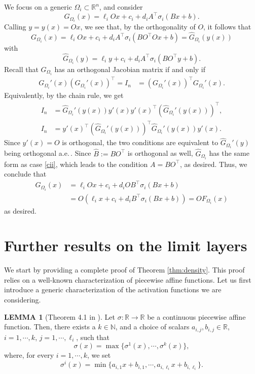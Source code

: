 \documentclass{article}
\theoremstyle{plain}
\theoremstyle{definition}
\theoremstyle{definition}
\newtheorem{lemma}[theorem]{LEMMA}
\theoremstyle{remark}
\theoremstyle{definition}
\theoremstyle{definition}
\theoremstyle{remark}
\numberwithin{equation}{section}
\begin{document}
We focus on a generic $\Omega_i\subset\mathbb{R}^n$, and consider
\[
G_{\Omega_i}(x) = \ell_i O x + c_i + d_i A^\top \sigma_i(Bx+b).
\]
Calling $y=y(x)=Ox$, we see that, by the orthogonality of $O$, it follows that
\[
G_{\Omega_i}(x)=\ell_i O x + c_i + d_i A^\top \sigma_i(BO^\top Ox+b) = \widehat{G}_{\Omega_i}(y(x)) 
\]
with 
\[
\widehat{G}_{\Omega_i}(y) = \ell_i y + c_i + d_i A^\top \sigma_i(BO^\top y + b).
\]
Recall that $G_{\Omega_i}$ has an orthogonal Jacobian matrix if and only if
\[
\begin{split}
G_{\Omega_i}'(x)(G_{\Omega_i}'(x))^\top = I_n &=(G_{\Omega_i}'(x))^\top G_{\Omega_i}'(x).
\end{split}
\]
Equivalently, by the chain rule, we get
\[
\begin{split}
I_n &=\widehat{G}_{\Omega_i}'(y(x))y'(x)y'(x)^\top (\widehat{G}_{\Omega_i}'(y(x)))^\top, \\
I_n &=y'(x)^\top (\widehat{G}_{\Omega_i}'(y(x)))^\top \widehat{G}_{\Omega_i}'(y(x))y'(x).
\end{split}
\]
Since $y'(x) = O$ is orthogonal, the two conditions are equivalent to $\widehat{G}_{\Omega_i}'(y)$ being orthogonal a.e.\,. Since $\widehat{B}:=BO^\top$ is orthogonal as well, $\widehat{G}_{\Omega_i}$ has the same form as case \ref{cii}, which leads to the condition $A = BO^\top$, as desired. Thus, we conclude that
\[
\begin{split}
G_{\Omega_i}(x) &= \ell_i O x + c_i + d_i O B^\top \sigma_i(Bx+b) \\
&= O(\ell_i x + c_i + d_i B^\top \sigma_i(Bx+b))=OF_{\Omega_i}(x)
\end{split}
\]
as desired.

\section{Further results on the limit layers}\label{app:limitLayers}

We start by providing a complete proof of Theorem \ref{thm:density}. This proof relies on a well-known characterization of piecewise affine functions.
Let us first introduce a generic characterization of the activation functions we are considering.
\begin{lemma}[Theorem 4.1 in \cite{ovchinnikov2000max}]\label{lemma:maxMin}
Let $\sigma:\mathbb{R}\to\mathbb{R}$ be a continuous piecewise affine function. Then, there exists a $k\in\mathbb{N}$, and a choice of scalars $a_{i,j},b_{i,j}\in\mathbb{R}$, $i=1,\cdots,k$, $j=1,\cdots,\ell_i$, such that
\begin{equation}\label{eq:pwl}
\sigma(x) = \max\{\sigma^1(x),\cdots,\sigma^k(x)\},
\end{equation}
where, for every $i =1, \cdots, k$, we set
\[
\sigma^i(x) = \min\{a_{i,1} x+b_{i,1},\cdots,a_{i,\ell_i}x+b_{i,\ell_i}\}.
\]
\end{lemma}
\end{document}
